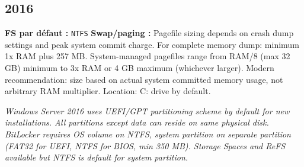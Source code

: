 \documentclass[10pt,a4paper]{article}
\begin{document}
\subsection{2016}
\noindent\small \textbf{FS par d\'efaut :} \texttt{NTFS} \quad\textbullet\quad \textbf{Swap/paging :} Pagefile sizing depends on crash dump settings and peak system commit charge. For complete memory dump: minimum 1x RAM plus 257 MB. System-managed pagefiles range from RAM/8 (max 32 GB) minimum to 3x RAM or 4 GB maximum (whichever larger). Modern recommendation: size based on actual system committed memory usage, not arbitrary RAM multiplier. Location: C: drive by default.\normalsize\par\smallskip
\noindent\small\textit{Windows Server 2016 uses UEFI/GPT partitioning scheme by default for new installations. All partitions except data can reside on same physical disk. BitLocker requires OS volume on NTFS, system partition on separate partition (FAT32 for UEFI, NTFS for BIOS, min 350 MB). Storage Spaces and ReFS available but NTFS is default for system partition.}\normalsize\par\smallskip
\end{document}
